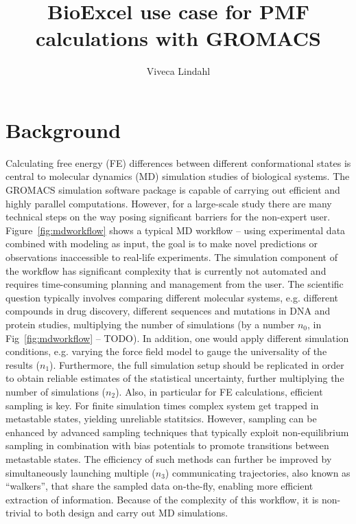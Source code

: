 \documentclass[11pt,a4paper]{article}
\title{BioExcel use case for PMF calculations with GROMACS}
\author{Viveca Lindahl}
\begin{document}
\maketitle
\tableofcontents

\section{Background}
Calculating free energy (FE) differences between different conformational states is central to molecular dynamics (MD) simulation studies of biological systems. The GROMACS simulation software package is capable of carrying out efficient and highly parallel computations. However, for a large-scale study there are many technical steps on the way posing significant barriers for the non-expert user. Figure~\ref{fig:mdworkflow} shows a typical MD workflow -- using experimental data combined with modeling as input, the goal is to  make novel predictions or observations inaccessible to real-life experiments. The simulation component of the workflow has significant complexity that is currently not automated and requires time-consuming planning and management from the user. The scientific question typically involves comparing different molecular systems, e.g. different compounds in drug discovery, different sequences and mutations in DNA and protein studies, multiplying the number of simulations (by a number $n_0$, in Fig~\ref{fig:mdworkflow} -- TODO). In addition, one would apply  different simulation conditions, e.g. varying the force field model to gauge the universality of the results ($n_1$). Furthermore, the full simulation setup should be replicated in order to obtain reliable estimates of the statistical uncertainty, further multiplying the number of simulations ($n_2$).  Also, in particular for FE calculations, efficient sampling is key. For finite simulation times complex system get trapped in metastable states, yielding unreliable statitsics. However, sampling can be enhanced by advanced sampling techniques that typically exploit non-equilibrium sampling in combination with bias potentials to promote transitions between metastable states. The efficiency of such methods can further be improved by simultaneously launching multiple ($n_3$) communicating trajectories, also known as ``walkers'', that share the sampled data on-the-fly, enabling more efficient extraction of information. Because of the complexity of this workflow, it is non-trivial to both design and carry out MD simulations. 
\end{document}
